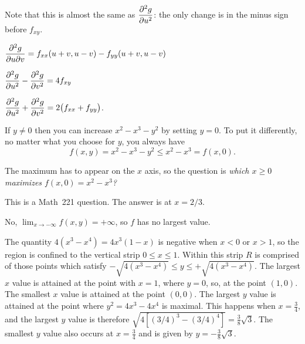 Note that this is almost the same as $\dfrac{\partial^2g}{\partial u^2}$: the only change is in the minus sign before $f_{xy}$.
\bigskip

\item[{\bfseries(IV15.15c)}]

   $\displaystyle\frac{\partial^2 g}{\partial u\partial v}= f_{xx}(u+v, u-v) - f_{yy}(u+v, u-v)$
\bigskip

\item[{\bfseries(IV15.15d)}]

$\dfrac{\partial^2 g}{\partial u^2} - \dfrac{\partial^2 g}{\partial v^2} = 4f_{xy} $
\bigskip

\item[{\bfseries(IV15.15e)}]

$\dfrac{\partial^2 g}{\partial u^2} + \dfrac{\partial^2 g}{\partial v^2} = 2\bigl(f_{xx}+f_{yy}\bigr)$.
\bigskip

\item[{\bfseries(V3.1a)}]
 If $y\neq0$ then you can increase $x^2-x^3-y^2$ by setting $y=0$.
To put it differently, no matter what you choose for $y$, you always have
\[
  f(x, y) = x^2-x^3-y^2 \leq x^2-x^3  =  f(x, 0).
\]
\bigskip

\item[{\bfseries(V3.1b)}]

The maximum has to appear on the $x$ axis, so the question is
\textit{which $x\geq0$ maximizes $f(x, 0) = x^2-x^3$?}

This is a Math~221 question.  The answer is at $x=2/3$.
\bigskip

\item[{\bfseries(V3.1c)}]

No, $\lim_{x\to-\infty} f(x, y) = +\infty$, so $f$ has no largest value.
\bigskip

\item[{\bfseries(V3.3)}]

%

The quantity $4(x^3-x^4) = 4x^3(1-x)$ is negative when $x<0$ or
$x>1$, so the region is confined to the vertical strip $0\leq x \leq
1$.  Within this strip $R$ is comprised of those points which satisfy
$-\sqrt{4(x^3-x^4)} \leq y \leq +\sqrt{4(x^3-x^4)}$.  The largest
$x$ value is attained at the point with $x=1$, where $y=0$, so, at the
point $(1,0)$.  The smallest $x$ value is attained at the point
$(0,0)$.   The largest $y$ value is attained at the point where
$y^2 = 4x^3-4x^4$ is maximal.  This happens when $x=\frac 34$, and the
largest $y$ value is therefore $\sqrt{4[(3/4)^3-(3/4)^4]} = \frac
38\sqrt{3}$.  The smallest $y$ value also occurs at $x=\frac 34$ and
is given by $y = -\frac 38 \sqrt 3$.
\bigskip

